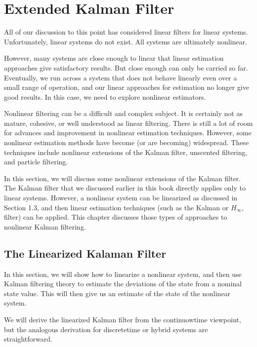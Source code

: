 \section{Extended Kalman Filter}
\label{extended_kalman_filter}

All of  our discussion to this point has considered linear filters for linear systems.
Unfortunately, linear systems do not  exist.  All systems are ultimately nonlinear.

However, many systems are  close enough to linear that linear estimation approaches give satisfactory results. 
But  close enough can only be carried so far.  Eventually, we run across a system 
that does not behave linearly even over a small range of  operation, and our linear 
approaches for  estimation  no longer give good results.  In this case, we  need  to  explore nonlinear estimators. 

Nonlinear filtering can be a difficult and complex subject.  It is certainly not as 
mature, cohesive, or well understood  as linear filtering. There is still a lot of  room 
for advances and improvement in nonlinear estimation techniques.  However, some 
nonlinear  estimation methods have become  (or are becoming) widespread.  These 
techniques  include nonlinear  extensions of  the Kalman filter,  unscented  filtering, 
and particle filtering.

In this section, we will discuss some nonlinear extensions of  the Kalman filter. 
The Kalman filter  that we  discussed earlier  in this book  directly  applies only to 
linear  systems.  However,  a  nonlinear  system  can  be  linearized  as discussed  in 
Section  1.3, and then  linear  estimation  techniques  (such  as the  Kalman  or  $H_{\infty}$, 
filter) can be applied.  This chapter discusses those types of approaches to nonlinear 
Kalman filtering.



\subsection{The Linearized Kalaman Filter }
\label{linearized_kalman_filter}
In  this section, we  will show how  to linearize a nonlinear system, and  then  use 
Kalman  filtering theory to estimate the  deviations  of  the state  from a  nominal 
state value. This will then give us an estimate of the state of the nonlinear system.

We will derive the linearized Kalman filter from the continuowtime viewpoint, but 
the analogous derivation for discretetime or hybrid systems are straightforward.

